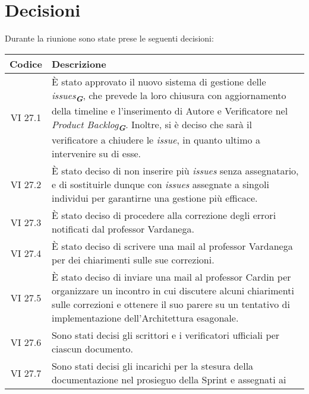 
\section{Decisioni}

Durante la riunione sono state prese le seguenti decisioni:

\vspace{0.5cm}

\begin{table}[htbp]
    \centering
    \begin{tabular}{|c|p{}|}
        \hline
        \rowcolor[gray]{0.75}
        \textbf{Codice} & \textbf{Descrizione}\\
        \hline
        VI 27.1 & È stato approvato il nuovo sistema di gestione delle \emph{issues}\textsubscript{\textit{\textbf{G}}}, che prevede
        la loro chiusura con aggiornamento della timeline e l'inserimento di Autore e Verificatore nel
        \emph{Product Backlog}\textsubscript{\textit{\textbf{G}}}. Inoltre, si è deciso che sarà il verificatore a chiudere le
        \emph{issue}, in quanto ultimo a intervenire su di esse. \\
        \hline
        VI 27.2 & È stato deciso di non inserire più \emph{issues} senza assegnatario, e di sostituirle dunque con \emph{issues}
        assegnate a singoli individui per garantirne una gestione più efficace. \\
        \hline
        VI 27.3 & È stato deciso di procedere alla correzione degli errori notificati dal professor Vardanega. \\
        \hline
        VI 27.4 & È stato deciso di scrivere una mail al professor Vardanega per dei chiarimenti sulle sue correzioni. \\
        \hline
        VI 27.5 & È stato deciso di inviare una mail al professor Cardin per organizzare un incontro in cui discutere alcuni
        chiarimenti sulle correzioni e ottenere il suo parere su un tentativo di implementazione dell'Architettura esagonale. \\
        \hline
        VI 27.6 & Sono stati decisi gli scrittori e i verificatori ufficiali per ciascun documento. \\
        \hline
        VI 27.7 & Sono stati decisi gli incarichi per la stesura della documentazione nel prosieguo della Sprint e assegnati ai

\end{tabular}
\end{table}
